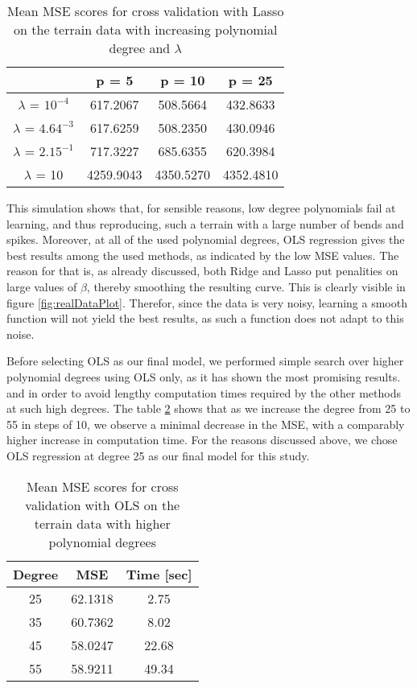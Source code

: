 \documentclass{article}
\begin{document}
\begin{table}[h!]
\centering
\begin{tabular}{||c c c c||}
\hline
& p = 5 & p = 10 & p = 25 \\
\hline
$\lambda$ = $10^{-4}$ & 617.2067 & 508.5664 & 432.8633\\
\hline
$\lambda$ = $4.64^{-3}$ & 617.6259 & 508.2350 & 430.0946 \\ 
\hline
$\lambda$ = $2.15^{-1}$ & 717.3227 & 685.6355 & 620.3984 \\
\hline
$\lambda$ = 10 & 4259.9043 & 4350.5270 & 4352.4810 \\
\hline
\end{tabular}
\caption{Mean MSE scores for cross validation with Lasso on the terrain data with increasing polynomial degree and $\lambda$}
\label{tbl:3}
\end{table}
This simulation shows that, for sensible reasons, low degree polynomials fail at learning, and thus reproducing, such a terrain with a large number of bends and spikes. Moreover, at all of the used polynomial degrees, OLS regression gives the best results among the used methods, as indicated by the low MSE values. The reason for that is, as already discussed, both Ridge and Lasso put penalities on large values of $\beta$, thereby smoothing the resulting curve. This is clearly visible in figure \ref{fig:realDataPlot}. Therefor, since the data is very noisy, learning a smooth function will not yield the best results, as such a function does not adapt to this noise.

Before selecting OLS as our final model, we performed simple search over higher polynomial degrees using OLS only, as it has shown the most promising results. and in order to avoid lengthy computation times required by the other methods at such high degrees. The table \ref{table:4} shows that as we increase the degree from 25 to 55 in steps of 10, we observe a minimal decrease in the MSE, with a comparably higher increase in computation time. For the reasons discussed above, we chose OLS regression at degree 25 as our final model for this study.
\begin{table}[h!]
\centering
\begin{tabular}{||c c c||} 
 \hline
 Degree & MSE & Time [sec]\\ 
 \hline
 25 & 62.1318 & 2.75 \\ 
 35 & 60.7362 & 8.02 \\
 45 & 58.0247 & 22.68 \\
 55 & 58.9211 & 49.34  \\  
 \hline
\end{tabular}
\caption{Mean MSE scores for cross validation with OLS on the terrain data with higher polynomial degrees}
\label{table:4}
\end{table}
\end{document}
